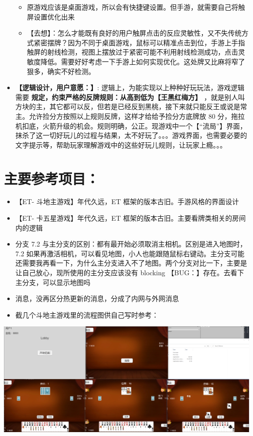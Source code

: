 \documentclass[9pt, b5paper]{article}
\begin{document}
\begin{itemize}
\begin{itemize}
\item 原游戏应该是桌面游戏，所以会有快捷键设置。但手游，就需要自己将触屏设置优化出来
\item 【去想】：怎么才能既有良好的用户触屏点击的反应灵敏性，又不失传统方式紧密摆牌？因为不同于桌面游戏，鼠标可以精准点击到位，手游上手指触屏的射线检测，视图上摆放过于紧密可能不利用射线检测成功，点击灵敏度降低。需要好好考虑一下手游上如何实现优化。这处牌又比麻将窄了狠多，确实不好检测。
\end{itemize}
\item \textbf{【逻辑设计，用户意愿：】}: 逻辑上，为能实现以上种种好玩玩法，游戏逻辑需要 \textbf{规定，约束严格的反牌规则：从高到低为【王黑红梅方】} ，就是别人叫方块的主，其它都可以反，但若是已经反到黑桃，接下来就只能反王或说是常主。允许捡分方按照以上规则反牌，这样才给给予捡分方底牌放 80 分，拖拉机扣底，火箭升级的机会。规则明确，公正。现游戏中一个【“流局”】界面，抹杀了这一切好玩儿的过程与结果，太不好玩了。。。游戏界面，也需要必要的文字提示等，帮助玩家理解游戏中的这些好玩儿规则，让玩家上瘾。。。
\end{itemize}

\section{主要参考项目：}
\label{sec:org2b53973}
\begin{itemize}
\item 【ET- 斗地主游戏】年代久远，ET 框架的版本古旧。手游风格的界面设计
\item 【ET- 卡五星游戏】年代久远，ET 框架的版本古旧。主要看牌类相关的房间内的逻辑
\item 分支 7.2 与主分支的区别：都有最开始必须取消主相机。区别是进入地图时，7.2 如果再激活相机，可以看见地图，小人也能跟随鼠标右键动。主分支可能还需要我再看一下，为什么主分支进入不了地图。两个分支对比一下，主要是让自己放心，现所使用的主分支应该没有 blocking 【BUG：】存在。去看下主分支，可以显示地图吗
\item 消息，没再区分热更新的消息，分成了内网与外网消息
\item 截几个斗地主游戏里的流程图供自己写时参考：
\end{itemize}

\begin{center}
\includegraphics[width=.9\linewidth]{./pic/readme_20230511_163501.png}
\end{center}
\end{document}
